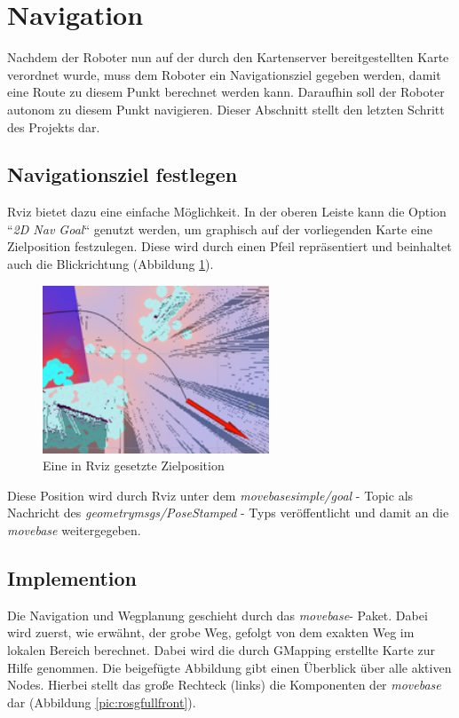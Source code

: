 \section{Navigation}
{	
		Nachdem der Roboter nun auf der durch den Kartenserver bereitgestellten Karte verordnet wurde, muss dem Roboter ein Navigationsziel gegeben werden, damit eine Route zu diesem Punkt berechnet werden kann. Daraufhin soll der Roboter autonom zu diesem Punkt navigieren. Dieser Abschnitt stellt den letzten Schritt des Projekts dar.
		
		\subsection{Navigationsziel festlegen}
		{
			Rviz bietet dazu eine einfache Möglichkeit. In der oberen Leiste kann die Option ``\emph{2D Nav Goal}`` genutzt werden, um graphisch auf der vorliegenden Karte eine Zielposition festzulegen. Diese wird durch einen Pfeil repräsentiert und beinhaltet auch die Blickrichtung (Abbildung \ref{pic:rviznavgoalsmall}).
			\begin{figure}[b]
				\centering
				\includegraphics[height=5cm]{Bilder/rviz_navgoal_small.png}
				\caption{Eine in Rviz gesetzte Zielposition} 
				\label{pic:rviznavgoalsmall}
			\end{figure}
		Diese Position wird durch Rviz unter dem \emph{move\textunderscore base\textunderscore simple/goal} - Topic als Nachricht des  \emph{geometry\textunderscore msgs/PoseStamped} - Typs veröffentlicht und damit an die \emph{move\textunderscore base} weitergegeben.
		}
	
		\subsection{Implemention}
		{
			
			
			Die Navigation und Wegplanung geschieht durch das \emph{move\tus base}- Paket. Dabei wird zuerst, wie erwähnt, der grobe Weg, gefolgt von dem exakten Weg im lokalen Bereich berechnet. Dabei wird die durch GMapping erstellte Karte zur Hilfe genommen. Die beigefügte Abbildung  gibt einen Überblick über alle aktiven Nodes. Hierbei stellt das große Rechteck (links) die Komponenten der \emph{move\tus base} dar (Abbildung \ref{pic:rosgfullfront}).
			

}}
